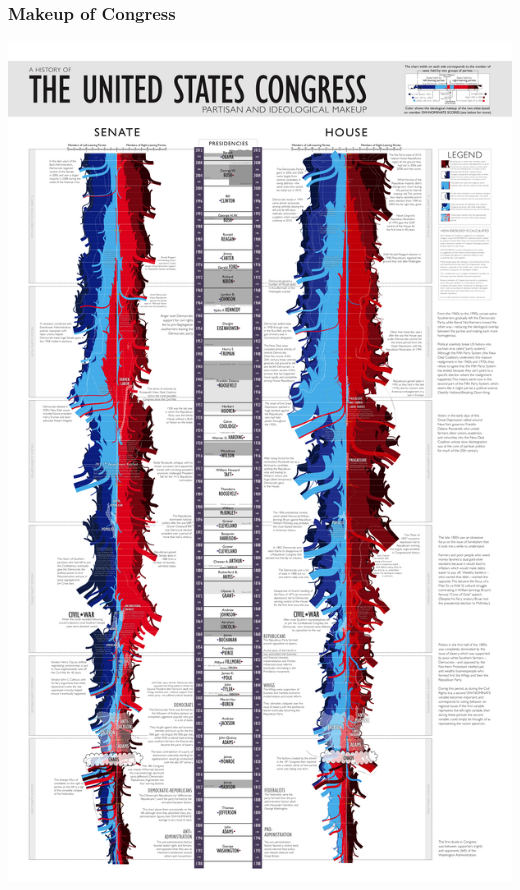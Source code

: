\documentclass[aspectratio=169]{beamer}
\theoremstyle{principle}
\begin{document}
\begin{frame}
\frametitle{Makeup of Congress}
\begin{center}
\includegraphics[scale=0.2]{congress_large.png}
\end{center}

\end{frame}
\end{document}
